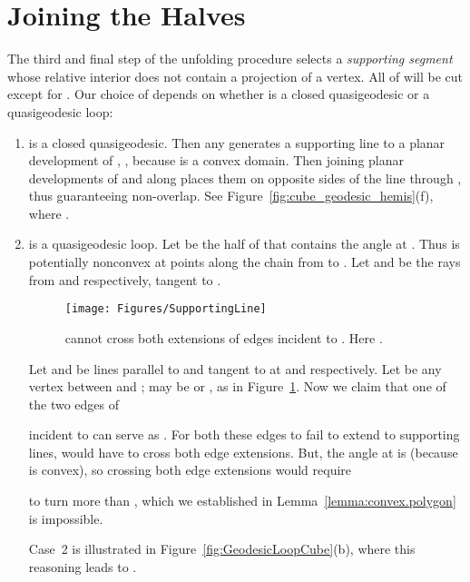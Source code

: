 \pdfoutput=1  \documentclass[]{article}
\newcommand{\hide}[1]{}
\newcommand{\figlab}[1]{\label{fig:#1}}
\newcommand{\lemref}[1]{\ref{lemma:#1}}
\newcommand{\figref}[1]{\ref{fig:#1}}
\newcommand{\squeezelist}{\setlength{\itemsep}{0pt}}
\begin{document}
\section{Joining the Halves}
The third and final step of the unfolding procedure
selects a \emph{supporting segment} 
whose relative interior does not contain
a projection  of a vertex.
All of  will be cut except for .
Our choice of  depends on whether  is a closed quasigeodesic
or a quasigeodesic loop:
\begin{enumerate}
\squeezelist
\item  is a closed quasigeodesic.
Then any  generates a supporting line to a planar development of ,
,
because  is a convex domain.
Then joining planar developments of  and  along 
places them on opposite sides of the line through ,
thus guaranteeing non-overlap.
See Figure~\figref{cube_geodesic_hemis}(f),
where .
\item  is a quasigeodesic loop.
Let  be the half of  that contains the angle  at .
Thus  is potentially nonconvex at
points along the chain  from  to .
\hide{
Nevertheless, some  might still be a supporting line of
.
This is the case in Figure~\figref{GeodesicLoopCube}, where several
supporting  options exist.

Although we do not have an example where no such supporting
 exists, neither do we have a method to guarantee that one
does exist.
So we follow a different strategy.

The argument using disjoint quasicone interiors 
in Lemma~\lemref{convex.polygon}
established that the complementary cone at

of angle , cone  in 
Figure~\figref{quasicones}(d), is empty in the planar
development of .
Thus this represents a \emph{supporting cone} to .
Now  is a convex planar domain, whose angle
at  is .  Thus the planar development of
 may be placed so that  of  and  of  coincide,
and  is the segment incident to .
In Figure~\figref{GeodesicLoopCube}(b),
.
Note that, due to symmetry, the segment  incident to 
is an equally valid choice.
}Let  and  be the rays from  and  respectively, tangent
to .
\begin{figure}[htbp]
\centering
\texttt{[image: Figures/SupportingLine]}
\caption{
 cannot cross both extensions of 
edges incident to .
Here .
}
\figlab{SupportingLine}
\end{figure}
Let  and  be lines parallel to  and 
tangent to  at  and  respectively.
Let  be any vertex between  and ;
 may be  or , as in
Figure~\figref{SupportingLine}.
Now we claim that one of the two edges of 

incident to  can serve as .
For both these edges to fail to extend to supporting
lines,  would have to cross both edge extensions.
But, the angle at  is 
(because  is convex),
so crossing both edge extensions would require
 
to turn more than , which we established in
Lemma~\lemref{convex.polygon} is impossible.

Case~2 is illustrated in Figure~\figref{GeodesicLoopCube}(b),
where this reasoning leads to .
\end{enumerate}
\end{document}
